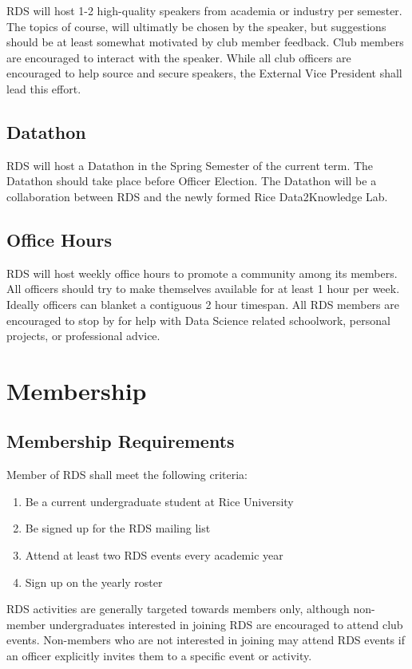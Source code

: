 \documentclass[12pt]{article}
\begin{document}
RDS will host 1-2 high-quality speakers from academia or industry per semester.  The
topics of course, will ultimatly be chosen by the speaker, but suggestions should
be at least somewhat motivated by club member feedback.  Club members are encouraged
to interact with the speaker.  While all club officers are encouraged to help
source and secure speakers, the External Vice President shall lead this effort.

\subsection{Datathon}

RDS will host a Datathon in the Spring Semester of the current term.  The
Datathon should take place before Officer Election.  The Datathon will be a
collaboration between RDS and the newly formed Rice Data2Knowledge Lab.  

\subsection{Office Hours}

RDS will host weekly office hours to promote a community among its members.
All officers should try to make themselves available for at least 1 hour per
week.  Ideally officers can blanket a contiguous 2 hour timespan.  All RDS
members are encouraged to stop by for help with Data Science related
schoolwork, personal projects, or professional advice.

\section{Membership}

\subsection{Membership Requirements}

Member of RDS shall meet the following criteria:
\begin{enumerate}
  \item Be a current undergraduate student at Rice University
  \item Be signed up for the RDS mailing list
  \item Attend at least two RDS events every academic year
  \item Sign up on the yearly roster
\end{enumerate}

RDS activities are generally targeted towards members only, although non-member
undergraduates interested in joining RDS are encouraged to attend club events.
Non-members who are not interested in joining may attend RDS events if an
officer explicitly invites them to a specific event or activity.
\end{document}
